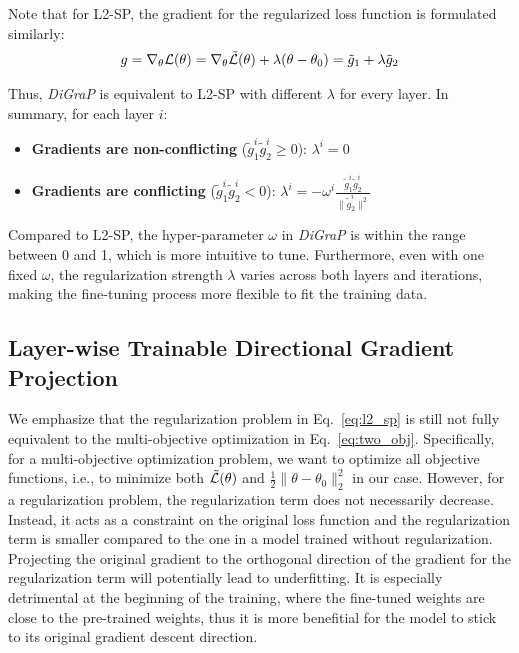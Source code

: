 Note that for L2-SP, the gradient for the regularized loss function is formulated similarly:
\begin{align}
    \label{l2sp_grad}
    g = \nabla_{\theta} \mathcal{L(\theta)} = \nabla_{\theta} \Tilde{\mathcal{L}}(\theta) + \lambda (\theta-\theta_0) = \tilde{g}_1 + \lambda \tilde{g}_2
\end{align}

Thus, \emph{DiGraP} is equivalent to L2-SP with different $\lambda$ for every layer. In summary, for each layer $i$:
\begin{itemize}
    \item \textbf{Gradients are non-conflicting} ($\tilde{g}_{1}^i \tilde{g}_{2}^i \geq 0$): $\lambda^i = 0$
    \item \textbf{Gradients are conflicting} ($\tilde{g}_{1}^i \tilde{g}_{2}^i < 0$): $\lambda^i = -\omega^i \frac{\tilde{g}_{1}^i \tilde{g}_{2}^i}{\|\tilde{g}_{2}^i\|^2}$
\end{itemize}

Compared to L2-SP, the hyper-parameter $\omega$ in \emph{DiGraP} is within the range between 0 and 1, which is more intuitive to tune. Furthermore, even with one fixed $\omega$, the regularization strength $\lambda$ varies across both layers and iterations, making the fine-tuning process more flexible to fit the training data.


\subsection{Layer-wise Trainable Directional Gradient Projection}
We emphasize that the regularization problem in Eq.~\ref{eq:l2_sp} is still not fully equivalent to the multi-objective optimization in Eq.~\ref{eq:two_obj}. Specifically, for a multi-objective optimization problem, we want to optimize all objective functions, i.e., to minimize both $\Tilde{\mathcal{L}}(\theta)$ and $\frac{1}{2}\|\theta-\theta_0\|^2_2$ in our case. However, for a regularization problem, the regularization term does not necessarily decrease. Instead, it acts as a constraint on the original loss function and the regularization term is smaller compared to the one in a model trained without regularization. Projecting the original gradient to the orthogonal direction of the gradient for the regularization term will potentially lead to underfitting. It is especially detrimental at the beginning of the training, where the fine-tuned weights are close to the pre-trained weights, thus it is more benefitial for the model to stick to its original gradient descent direction.

